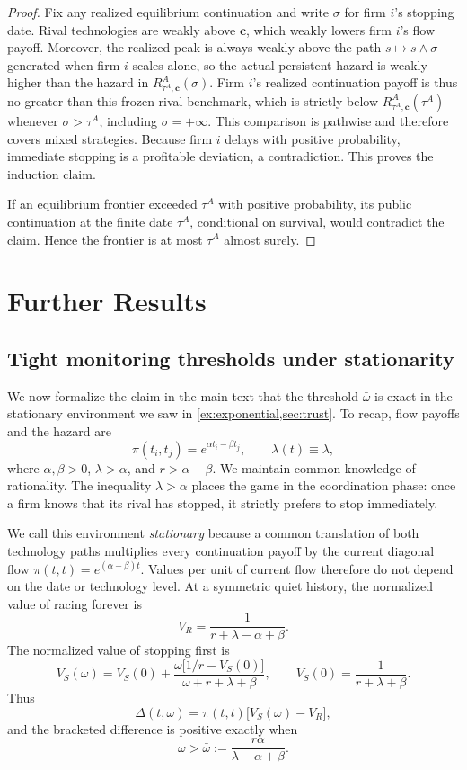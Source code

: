 \documentclass[12pt,reqno]{article}
\theoremstyle{definition} \newtheorem{example}{Example}
\theoremstyle{definition} \newtheorem{condition}{Condition}
\theoremstyle{definition} \newtheorem{corollary}{Corollary}
\theoremstyle{definition} \newtheorem{claim}{Claim}
\theoremstyle{definition} \newtheorem{definition}{Definition}
\theoremstyle{definition} \newtheorem{conjecture}{Conjecture}
\theoremstyle{definition} \newtheorem{Lemma}{Lemma}
\theoremstyle{definition} \newtheorem{lemma}{Lemma}
\theoremstyle{plain} \newtheorem{theorem}{Theorem}
\theoremstyle{definition} \newtheorem{assumption}{Assumption}
\theoremstyle{definition} \newtheorem*{assumptionnonumber}{Assumption}
\theoremstyle{definition} \newtheorem*{theoremNoNumber}{Proposition}
\theoremstyle{definition}
\theoremstyle{definition}\newtheorem{proposition}{Proposition}
\theoremstyle{definition} \newtheorem{result}{Result}
\theoremstyle{definition} \newtheorem*{definitionNoNumber}{Definition}
\theoremstyle{definition} \newtheorem{Definition}{Definition}
\theoremstyle{definition} \newtheorem*{DefinitionNoNumber}{Definition}
\theoremstyle{definition} \newtheorem*{fact}{Fact}
\theoremstyle{definition} \newtheorem*{property}{Property}
\theoremstyle{definition} \newtheorem{remark}{Remark}
\begin{document}
\begin{proof}
Fix any realized equilibrium continuation and write $\sigma$ for firm $i$'s
stopping date. Rival technologies are weakly above $\bm c$, which weakly lowers
firm $i$'s flow payoff. Moreover, the realized peak is always weakly above the
path $s\mapsto s\wedge\sigma$ generated when firm $i$ scales alone, so the
actual persistent hazard is weakly higher than the hazard in
$R^A_{\tau^A,\bm c}(\sigma)$. Firm $i$'s realized continuation payoff is thus
no greater than this frozen-rival benchmark, which is strictly below
$R^A_{\tau^A,\bm c}(\tau^A)$ whenever $\sigma>\tau^A$, including
$\sigma=+\infty$. This comparison is pathwise and therefore covers mixed
strategies. Because firm $i$ delays with positive probability, immediate
stopping is a profitable deviation, a contradiction. This proves the
induction claim.

If an equilibrium frontier exceeded $\tau^A$ with positive probability, its
public continuation at the finite date $\tau^A$, conditional on survival,
would contradict the claim. Hence the frontier is at most $\tau^A$ almost
surely.
\end{proof}




\section{Further Results}\label{app:further}

\subsection{Tight monitoring thresholds under stationarity} We now formalize the claim in the main text that the threshold $\bar \omega$ is exact in the stationary environment we saw in 
\cref{ex:exponential,sec:trust}. To recap, flow payoffs and the hazard are
\[
\pi(t_i,t_j)=e^{\alpha t_i-\beta t_j},
\qquad
\lambda(t)\equiv\lambda,
\]
where $\alpha,\beta>0$, $\lambda>\alpha$, and $r>\alpha-\beta$. We maintain
common knowledge of rationality. The inequality $\lambda>\alpha$ places the
game in the coordination phase: once a firm knows that its rival has stopped,
it strictly prefers to stop immediately.

We call this environment \emph{stationary} because a common translation of
both technology paths multiplies every continuation payoff by the current
diagonal flow $\pi(t,t)=e^{(\alpha-\beta)t}$. Values per unit of current flow
therefore do not depend on the date or technology level. At a symmetric quiet
history, the normalized value of racing forever is
\[
V_R=\frac{1}{r+\lambda-\alpha+\beta}.
\]
The normalized value of stopping first is
\[
V_S(\omega)
=V_S(0)
+\frac{\omega\big[1/r-V_S(0)\big]}
{\omega+r+\lambda+\beta},
\qquad
V_S(0)=\frac{1}{r+\lambda+\beta}.
\]
Thus
\[
\Delta(t,\omega)
=\pi(t,t)\big[V_S(\omega)-V_R\big],
\]
and the bracketed difference is positive exactly when
\[
\omega>\bar\omega
:=\frac{r\alpha}{\lambda-\alpha+\beta}.
\]
\end{document}
